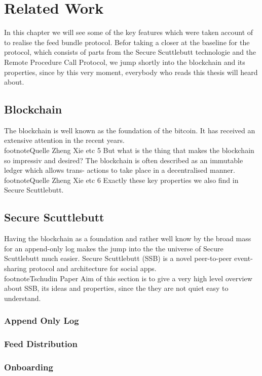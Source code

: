 \chapter{Related Work}
In this chapter we will see some of the key features which were taken account of to realise the
feed bundle protocol. Befor taking a closer at the baseline for the protocol, which consists of
parts from the Secure Scuttlebutt technologie and the Remote Procedure Call Protocol, we
jump shortly into the blockchain and its properties, since by this very moment, everybody
who reads this thesis will heard about.
\section{Blockchain}
The blockchain is well known as the foundation of the bitcoin. It has received an extensive
attention in the recent years.\\footnote{Quelle Zheng Xie etc} 5 But what is the thing that makes the blockchain so impressiv
and desired? The blockchain is often described as an immutable ledger which allows trans-
actions to take place in a decentralised manner.\\footnote{Quelle Zheng Xie etc} 6 Exactly these key properties we also find
in Secure Scuttlebutt.
\section{Secure Scuttlebutt}
Having the blockchain as a foundation and rather well know by the broad mass for an
append-only log makes the jump into the the universe of Secure Scuttlebutt much easier.
Secure Scuttlebutt (SSB) is a novel peer-to-peer event-sharing protocol and architecture for
social apps.\\footnote{Tschudin Paper} Aim of this section is to give a very high level overview about SSB, its ideas
and properties, since the they are not quiet easy to understand.
\subsection{Append Only Log}
\subsection{Feed Distribution}
\subsection{Onboarding}
